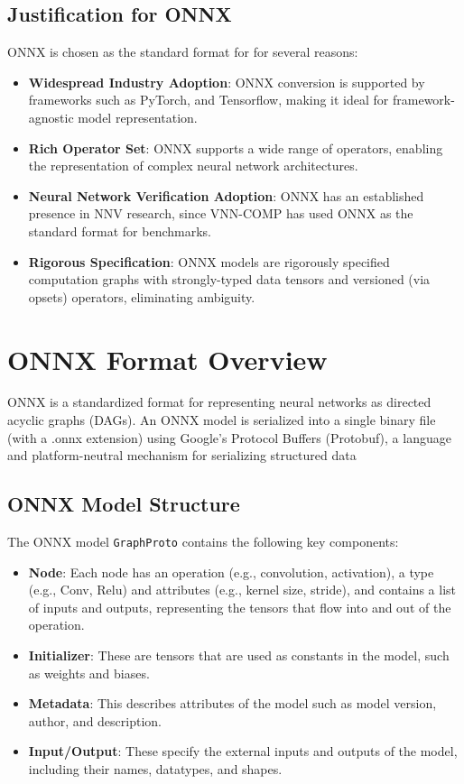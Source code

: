 \subsection{Justification for ONNX}
ONNX is chosen as the standard format for \vnnlib{} for several reasons:
\begin{itemize}
	\item \textbf{Widespread Industry Adoption}: ONNX conversion is supported by frameworks such as PyTorch, and Tensorflow, making it ideal for framework-agnostic model representation.
	\item \textbf{Rich Operator Set}: ONNX supports a wide range of operators, enabling the representation of complex neural network architectures.
	\item \textbf{Neural Network Verification Adoption}: ONNX has an established presence in NNV research, since VNN-COMP has used ONNX as the standard format for benchmarks.
	\item \textbf{Rigorous Specification}: ONNX models are rigorously specified computation graphs with strongly-typed data tensors and versioned (via opsets) operators, eliminating ambiguity.
\end{itemize}

\section{ONNX Format Overview}
\label{sec:onnx_overview}
ONNX is a standardized format for representing neural networks as directed acyclic graphs (DAGs). An ONNX model is serialized into a single binary file (with a .onnx extension) using Google's Protocol Buffers 
(Protobuf), a language and platform-neutral mechanism for serializing structured data

\subsection{ONNX Model Structure}
The ONNX model \texttt{GraphProto} contains the following key components:
\begin{itemize}
	\item \textbf{Node}: Each node has an operation (e.g., convolution, activation), a type (e.g., Conv, Relu) and attributes 
	(e.g., kernel size, stride), and contains a list of inputs and outputs, representing the tensors that flow into and out of the operation.
	\item \textbf{Initializer}: These are tensors that are used as constants in the model, such as weights and biases.
	\item \textbf{Metadata}: This describes attributes of the model such as model version, author, and description.
	\item \textbf{Input/Output}: These specify the external inputs and outputs of the model, including their names, datatypes, and shapes.
\end{itemize}

